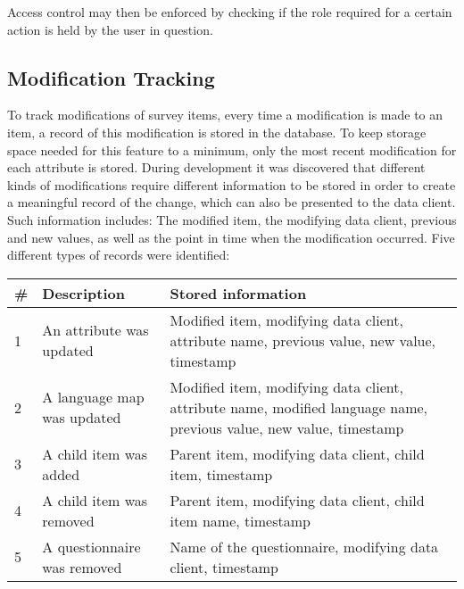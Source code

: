     Access control may then be enforced by checking if the role required
    for a certain action is held by the user in question.

\subsection{Modification Tracking}
\label{section:modification-tracking}
    To track modifications of survey items, every time a modification
    is made to an item, a record of this modification is stored in the
    database. To keep storage space needed for this feature to a minimum,
    only the most recent modification for each attribute is stored.
    During development it was discovered that different kinds of modifications
    require different information to be stored in order to create a meaningful
    record of the change, which can also be presented to the data client.
    Such information includes: The modified item, the modifying data client,
    previous and new values, as well as the point in time when the modification
    occurred. Five different types of records were identified:

    \begin{table}[H]
        \begin{tabularx}{\textwidth}{|l|l|X|}
            \hline
            \# & Description & Stored information \\
            \hline \hline
            1 & An attribute was updated  & Modified item, modifying data client, attribute name, previous value, new value, timestamp \\
            2 & A language map was updated & Modified item, modifying data client, attribute name, modified language name, previous value, new value, timestamp \\
            \hline
            3 & A child item was added & Parent item, modifying data client, child item, timestamp \\
            4 & A child item was removed & Parent item, modifying data client, child item name, timestamp \\
            \hline
            5 & A questionnaire was removed & Name of the questionnaire, modifying data client, timestamp\\
            \hline
        \end{tabularx}
    \end{table}

